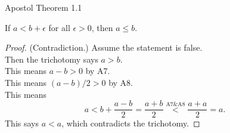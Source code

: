 \documentclass{beamer}
\begin{document}
\begin{frame}{Apostol Theorem 1.1}
\begin{thm}
If $a < b + \epsilon$ for all $\epsilon > 0$, then $a\leq b$.
\end{thm}
\pause
\begin{proof}
(Contradiction.)  Assume the statement is false.\\
\pause
Then the trichotomy says $a > b$.\\
\pause
This means $a-b > 0$ by A7.\\
\pause
This means $(a-b)/2 > 0$ by A8.\\
\pause
This means
$$a < b + \frac{a-b}{2} = \frac{a+b}{2} \stackrel{\text{A7\&A8}}{<} \frac{a+a}{2} = a.$$
\pause
This says $a < a$, which contradicts the trichotomy.
\end{proof}
\end{frame}
\end{document}

